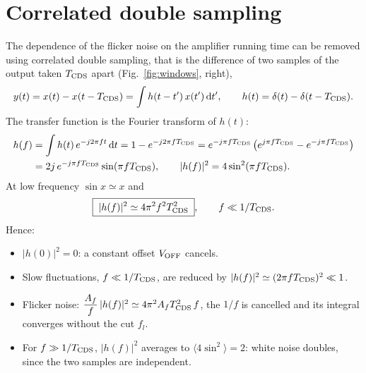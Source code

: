 \documentclass[11pt,a4paper]{article}
\newcommand{\dd}{\mathrm{d}}
\newcommand{\Tcds}{T_{\rm CDS}}
\newcommand{\Voff}{V_{\rm OFF}}
\begin{document}
\section{Correlated double sampling}
\label{sec:cds}
%
The dependence of the flicker noise on the amplifier running time can be removed using
correlated double sampling, that is the difference of two samples of the output
taken $\Tcds$ apart (Fig.~\ref{fig:windows}, right),
%
\begin{equation}
 y(t) = x(t) - x(t-\Tcds)
      = \int h(t-t')\,x(t')\,\dd t' ,
 \qquad h(t)=\delta(t)-\delta(t-\Tcds).
\end{equation}
%
The transfer function is the Fourier transform of $h(t)$:
%
\begin{align}
 h(f) &= \int h(t)\,e^{-j2\pi ft}\,\dd t = 1-e^{-j2\pi f\Tcds}
       = e^{-j\pi f\Tcds}\left(e^{j\pi f\Tcds}-e^{-j\pi f\Tcds}\right) \nonumber\\
      &= 2j\,e^{-j\pi f\Tcds}\sin(\pi f\Tcds),
 \qquad |h(f)|^2 = 4\sin^2(\pi f\Tcds).
\label{eq:cds}
\end{align}
%
At low frequency $\sin x\simeq x$ and
%
\begin{equation}
 \boxed{\;|h(f)|^2 \simeq 4\pi^2 f^2\Tcds^2\;} ,
 \qquad f\ll 1/\Tcds .
\label{eq:cdslow}
\end{equation}
%
Hence:
%
\begin{itemize}
\item $|h(0)|^2=0$: a constant offset $\Voff$ cancels.
\item Slow fluctuations, $f\ll1/\Tcds$, are reduced by
  $|h(f)|^2\simeq(2\pi f\Tcds)^2\ll1$.
\item Flicker noise: $\dfrac{A_f}{f}\,|h(f)|^2\simeq4\pi^2A_f\Tcds^2\,f$,
  the $1/f$ is cancelled and its integral converges without the cut $f_l$.
\item For $f\gg1/\Tcds$, $|h(f)|^2$ averages to $\langle4\sin^2\rangle=2$:
  white noise doubles, since the two samples are independent.
\end{itemize}

\end{document}
